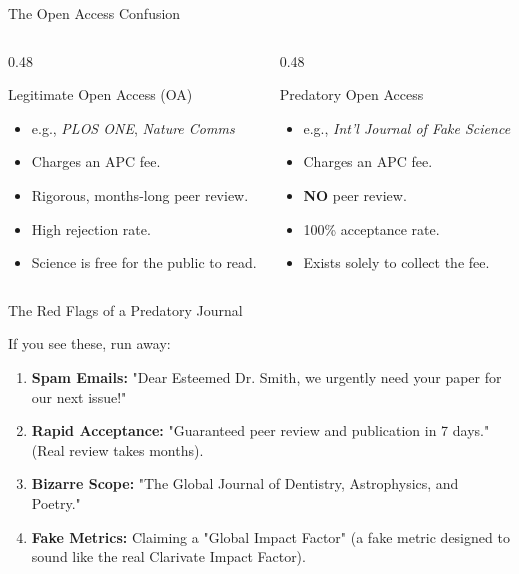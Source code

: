 \documentclass[aspectratio=169]{beamer}
\begin{document}
\begin{frame}{The Open Access Confusion}
  \begin{columns}[T]
    \begin{column}{0.48\textwidth}
      \begin{block}{Legitimate Open Access (OA)}
        \begin{itemize}
          \item e.g., \textit{PLOS ONE}, \textit{Nature Comms}
          \item Charges an APC fee.
          \item Rigorous, months-long peer review.
          \item High rejection rate.
          \item Science is free for the public to read.
        \end{itemize}
      \end{block}
    \end{column}
    \begin{column}{0.48\textwidth}
      \begin{alertblock}{Predatory Open Access}
        \begin{itemize}
          \item e.g., \textit{Int'l Journal of Fake Science}
          \item Charges an APC fee.
          \item \textbf{NO} peer review.
          \item 100\% acceptance rate.
          \item Exists solely to collect the fee.
        \end{itemize}
      \end{alertblock}
    \end{column}
  \end{columns}
\end{frame}

\begin{frame}{The Red Flags of a Predatory Journal}
  \begin{exampleblock}{If you see these, run away:}
    \begin{enumerate}
      \item \textbf{Spam Emails:} "Dear Esteemed Dr. Smith, we urgently need your paper for our next issue!"
      \item \textbf{Rapid Acceptance:} "Guaranteed peer review and publication in 7 days." (Real review takes months).
      \item \textbf{Bizarre Scope:} "The Global Journal of Dentistry, Astrophysics, and Poetry."
      \item \textbf{Fake Metrics:} Claiming a "Global Impact Factor" (a fake metric designed to sound like the real Clarivate Impact Factor).
    \end{enumerate}
  \end{exampleblock}
\end{frame}
\end{document}
